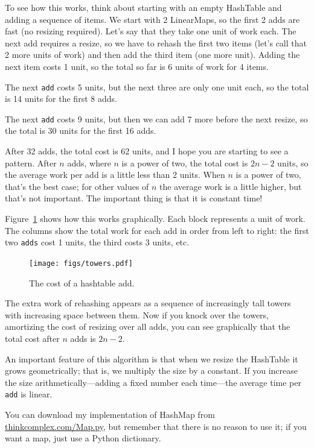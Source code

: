 \documentclass[10pt]{book}
\begin{document}
To see how this works, think about starting with an empty
HashTable and adding a sequence of items.  We start with 2 LinearMaps,
so the first 2 adds are fast (no resizing required).  Let's
say that they take one unit of work each.  The next add
requires a resize, so we have to rehash the first two
items (let's call that 2 more units of work) and then
add the third item (one more unit).  Adding the next item
costs 1 unit, so the total so far is
6 units of work for 4 items.

The next {\tt add} costs 5 units, but the next three
are only one unit each, so the total is 14 units for the
first 8 adds.

The next {\tt add} costs 9 units, but then we can add 7 more
before the next resize, so the total is 30 units for the
first 16 adds.

After 32 adds, the total cost is 62 units, and I hope you are starting
to see a pattern.  After $n$ adds, where $n$ is a power of two, the
total cost is $2n - 2$ units, so the average work per add is
a little less than 2 units.  When $n$ is a power of two, that's
the best case; for other values of $n$ the average work is a little
higher, but that's not important.  The important thing is that it
is constant time!

Figure~\ref{fig.hash} shows how this works graphically.  Each
block represents a unit of work.  The columns show the total
work for each add in order from left to right: the first two
{\tt adds} cost 1 units, the third costs 3 units, etc.

\begin{figure}
\centerline{\texttt{[image: figs/towers.pdf]}}
\caption{The cost of a hashtable add.\label{fig.hash}}
\end{figure}

The extra work of rehashing appears as a sequence of increasingly
tall towers with increasing space between them.  Now if you knock
over the towers, amortizing the cost of resizing over all
adds, you can see graphically that the total cost after $n$
adds is $2n - 2$.

An important feature of this algorithm is that when we resize the
HashTable it grows geometrically; that is, we multiply the size by a
constant.  If you increase the size
arithmetically---adding a fixed number each time---the average time
per {\tt add} is linear.

You can download my implementation of HashMap from
\url{thinkcomplex.com/Map.py}, but remember that there
is no reason to use it; if you want a map, just use a Python dictionary.
\end{document}
